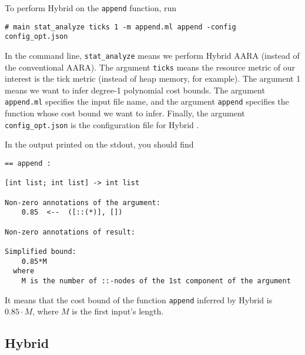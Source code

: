 To perform Hybrid \Opt{} on the \texttt{append} function, run
\begin{verbatim}
# main stat_analyze ticks 1 -m append.ml append -config config_opt.json
\end{verbatim}
%
In the command line, \texttt{stat\_analyze} means we perform Hybrid AARA
(instead of the conventional AARA).
%
The argument \texttt{ticks} means the resource metric of our interest is the
tick metric (instead of heap memory, for example).
%
The argument 1 means we want to infer degree-1 polynomial cost bounds.
%
The argument \texttt{append.ml} specifies the input file name, and the argument
\texttt{append} specifies the function whose cost bound we want to infer.
%
Finally, the argument \texttt{config\_opt.json} is the configuration file for
Hybrid \Opt{}.

In the output printed on the stdout, you should find
\begin{verbatim}
== append :

[int list; int list] -> int list

Non-zero annotations of the argument:
    0.85  <--  ([::(*)], [])

Non-zero annotations of result:

Simplified bound:
    0.85*M
  where
    M is the number of ::-nodes of the 1st component of the argument
\end{verbatim}
%
It means that the cost bound of the function \texttt{append} inferred by Hybrid
\Opt{} is $0.85 \cdot M$, where $M$ is the first input's length.

\subsection{Hybrid \BayesWC{}}

